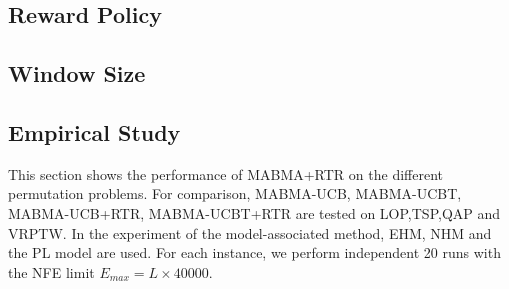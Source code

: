 \subsection{Reward Policy}
\subsection{Window Size}
\subsection{Empirical Study}
This section shows the performance of MABMA+RTR on the different permutation problems. For comparison, MABMA-UCB, MABMA-UCBT, MABMA-UCB+RTR, MABMA-UCBT+RTR are tested on LOP,TSP,QAP and VRPTW. In the experiment of the model-associated method, EHM, NHM and the PL model are used. For each instance, we perform independent 20 runs with the NFE limit $E_{max} = L \times 40000$.


